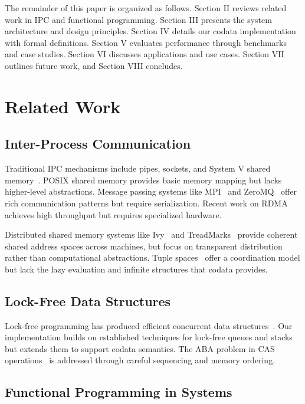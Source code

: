 \documentclass[10pt,conference]{IEEEtran}
\begin{document}
The remainder of this paper is organized as follows. Section II reviews related work in IPC and functional programming. Section III presents the system architecture and design principles. Section IV details our codata implementation with formal definitions. Section V evaluates performance through benchmarks and case studies. Section VI discusses applications and use cases. Section VII outlines future work, and Section VIII concludes.

\section{Related Work}

\subsection{Inter-Process Communication}

Traditional IPC mechanisms include pipes, sockets, and System V shared memory~\cite{stevens2013advanced}. POSIX shared memory provides basic memory mapping but lacks higher-level abstractions. Message passing systems like MPI~\cite{gropp1996high} and ZeroMQ~\cite{hintjens2013zeromq} offer rich communication patterns but require serialization. Recent work on RDMA~\cite{kalia2014using} achieves high throughput but requires specialized hardware.

Distributed shared memory systems like Ivy~\cite{li1988shared} and TreadMarks~\cite{amza1996treadmarks} provide coherent shared address spaces across machines, but focus on transparent distribution rather than computational abstractions. Tuple spaces~\cite{gelernter1985generative} offer a coordination model but lack the lazy evaluation and infinite structures that codata provides.

\subsection{Lock-Free Data Structures}

Lock-free programming has produced efficient concurrent data structures~\cite{michael1996simple, harris2001pragmatic}. Our implementation builds on established techniques for lock-free queues and stacks but extends them to support codata semantics. The ABA problem in CAS operations~\cite{dechev2010understanding} is addressed through careful sequencing and memory ordering.

\subsection{Functional Programming in Systems}
\end{document}

